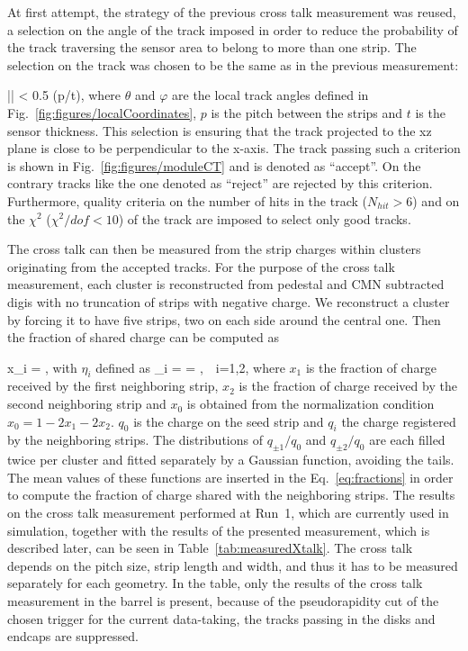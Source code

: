 At first attempt, the strategy of the previous cross talk measurement was reused, a selection on the angle of the track imposed in order to reduce the probability of the track traversing the sensor area to belong to more than one strip. The selection on the track was chosen to be the same as in the previous measurement:

{
|\tan \theta \cos \varphi| < 0.5 \times (p/t),
}
where $\theta$ and $\varphi$ are the local track angles defined in Fig.~\ref{fig:figures/localCoordinates}, $p$ is the pitch between the strips and $t$ is the sensor thickness. This selection is ensuring that the track projected to the xz plane is close to be perpendicular to the x-axis. The track passing such a criterion is shown in Fig.~\ref{fig:figures/moduleCT} and is denoted as ``accept''. On the contrary tracks like the one denoted as ``reject'' are rejected by this criterion. Furthermore, quality criteria on the number of hits in the track ($N_{hit}>6$) and on the $\chi^{2}$  ($\chi^{2}/dof < 10$) of the track are imposed to select only good tracks. 

The cross talk can then be measured from the strip charges within clusters originating from the accepted tracks. For the purpose of the cross talk measurement, each cluster is reconstructed from pedestal and CMN subtracted digis with no truncation of strips with negative charge. We reconstruct a cluster by forcing it to have five strips, two on each side around the central one. Then the fraction of shared charge can be computed as


{
x_{i} =  ,
}
with $\eta_{i}$ defined as
{
\eta_{\pm i} =  =  ,~~i=1,2,
}
where $x_{1}$ is the fraction of charge received by the first neighboring strip,  $x_{2}$ is the fraction of charge received by the second neighboring strip and $x_{0}$ is obtained from the normalization condition $x_{0} = 1-2x_{1}-2x_{2}$. $q_{0}$ is the charge on the seed strip and $q_{i}$ the charge registered by the neighboring strips. The distributions of $q_{\pm 1}/q_{0}$ and $q_{\pm 2}/q_{0}$ are each filled twice per cluster and fitted separately by a Gaussian function, avoiding the tails. The mean values of these functions are inserted in the Eq.~\ref{eq:fractions} in order to compute the fraction of charge shared with the neighboring strips. The results on the cross talk measurement performed at Run~1, which are currently used in simulation, together with the results of the presented measurement, which is described later, can be seen in Table~\ref{tab:measuredXtalk}. The cross talk depends on the pitch size, strip length and width, and thus it has to be measured separately for each geometry. In the table, only the results of the cross talk measurement in the barrel is present, because of the pseudorapidity cut of the chosen trigger for the current data-taking, the tracks passing in the disks and endcaps are suppressed. 


